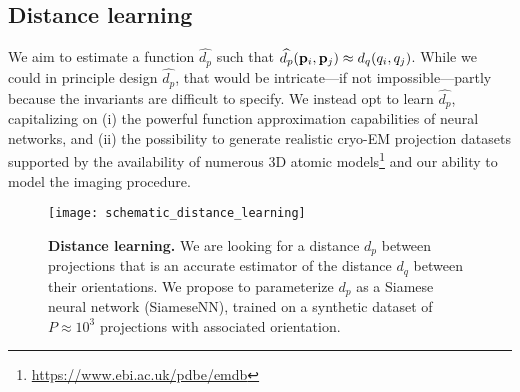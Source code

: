 
\subsection{Distance learning}\label{sec:method:distance-learning}


We aim to estimate a function $\widehat{d_p}$ such that $\widehat{d_p}(\mathbf{p}_i, \mathbf{p}_j) \approx d_q(q_i, q_j)$.
While we could in principle design $\widehat{d_p}$, that would be intricate---if not impossible---partly because the invariants are difficult to specify.
We instead opt to learn $\widehat{d_p}$, capitalizing on (i) the powerful function approximation capabilities of neural networks, and (ii) the possibility to generate realistic cryo-EM projection datasets supported by the availability of numerous 3D atomic models\footnote{\url{https://www.ebi.ac.uk/pdbe/emdb}} and our ability to model the imaging procedure.

\begin{figure}
    \centering
    \texttt{[image: schematic\_distance\_learning]}
    \caption{%
        \textbf{Distance learning.}
        We are looking for a distance $d_p$ between projections that is an accurate estimator of the distance $d_q$ between their orientations.
        We propose to parameterize $d_p$ as a Siamese neural network (SiameseNN), trained on a synthetic dataset of $P \approx 10^3$ projections with associated orientation.
}\label{fig:schematic:distance-learning}
\end{figure}


